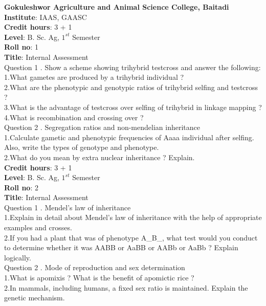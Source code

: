 \documentclass[12pt]{article}\usepackage[]{graphicx}\usepackage[]{color}
\begin{document}
{\centering
            \Large{\textbf{Gokuleshwor Agriculture and Animal Science College, Baitadi}} \\[0.25cm]
            \textbf{Institute}: IAAS, GAASC \\}\textbf{Credit hours}: 3 + 1 \\\textbf{Level}: B. Sc. Ag, $1^{st}$ Semester \\\textbf{Roll no}: 1 \\\textbf{Title}: Internal Assessment \\[1cm]Question 1 . Show a scheme showing trihybrid testcross and answer the following: \\\hspace{0.5cm}1.What gametes are produced by a trihybrid individual ?\\\hspace{0.5cm}2.What are the phenotypic and genotypic ratios of trihybrid selfing and testcross ?\\\hspace{0.5cm}3.What is the advantage of testcross over selfing of trihybrid in linkage mapping ?\\\hspace{0.5cm}4.What is recombination and crossing over ?\\Question 2 . Segregation ratios and non-mendelian inheritance \\\hspace{0.5cm}1.Calculate gametic and phenotypic frequencies of Aaaa individual after selfing. Also, write the types of genotype and phenotype.\\\hspace{0.5cm}2.What do you mean by extra nuclear inheritance ? Explain.\\\textbf{Credit hours}: 3 + 1 \\\textbf{Level}: B. Sc. Ag, $1^{st}$ Semester \\\textbf{Roll no}: 2 \\\textbf{Title}: Internal Assessment \\[1cm]Question 1 . Mendel's law of inheritance \\\hspace{0.5cm}1.Explain in detail about Mendel's law of inheritance with the help of appropriate examples and crosses.\\\hspace{0.5cm}2.If you had a plant that was of phenotype A\_B\_, what test would you conduct to determine whether it was AABB or AaBB or AABb or AaBb ? Explain logically.\\Question 2 . Mode of reproduction and sex determination \\\hspace{0.5cm}1.What is apomixis ? What is the benefit of apomictic rice ?\\\hspace{0.5cm}2.In mammals, including humans, a fixed sex ratio is maintained. Explain the genetic mechanism.\\\clearpage{\centering
}
\end{document}
